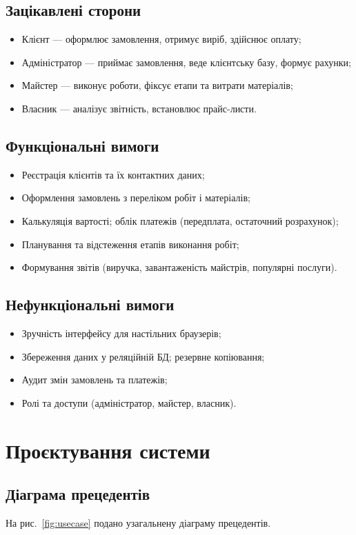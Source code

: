 \documentclass[14pt,a4paper]{extarticle}
\begin{document}
\subsection{Зацікавлені сторони}
\begin{itemize}
  \item Клієнт — оформлює замовлення, отримує виріб, здійснює оплату;
  \item Адміністратор — приймає замовлення, веде клієнтську базу, формує рахунки;
  \item Майстер — виконує роботи, фіксує етапи та витрати матеріалів;
  \item Власник — аналізує звітність, встановлює прайс-листи.
\end{itemize}

\subsection{Функціональні вимоги}
\begin{itemize}
  \item Реєстрація клієнтів та їх контактних даних;
  \item Оформлення замовлень з переліком робіт і матеріалів;
  \item Калькуляція вартості; облік платежів (передплата, остаточний розрахунок);
  \item Планування та відстеження етапів виконання робіт;
  \item Формування звітів (виручка, завантаженість майстрів, популярні послуги).
\end{itemize}

\subsection{Нефункціональні вимоги}
\begin{itemize}
  \item Зручність інтерфейсу для настільних браузерів;
  \item Збереження даних у реляційній БД; резервне копіювання;
  \item Аудит змін замовлень та платежів;
  \item Ролі та доступи (адміністратор, майстер, власник).
\end{itemize}

\section{Проєктування системи}
\subsection{Діаграма прецедентів}
На рис.~\ref{fig:usecase} подано узагальнену діаграму прецедентів.
\end{document}
